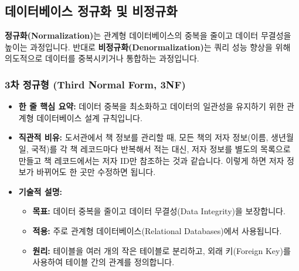 \documentclass[11pt,a4paper]{article}
\theoremstyle{definition}
\begin{document}
\subsection{데이터베이스 정규화 및 비정규화}

\begin{conceptbox}
\textbf{정규화(Normalization)}는 관계형 데이터베이스의 중복을 줄이고 데이터 무결성을 높이는 과정입니다.
반대로 \textbf{비정규화(Denormalization)}는 쿼리 성능 향상을 위해 의도적으로 데이터를 중복시키거나 통합하는 과정입니다.
\end{conceptbox}

\subsubsection{3차 정규형 (Third Normal Form, 3NF)}
\begin{itemize}
    \item \textbf{한 줄 핵심 요약:} 데이터 중복을 최소화하고 데이터의 일관성을 유지하기 위한 관계형 데이터베이스 설계 규칙입니다.
    \item \textbf{직관적 비유:} 도서관에서 책 정보를 관리할 때, 모든 책의 저자 정보(이름, 생년월일, 국적)를 각 책 레코드마다 반복해서 적는 대신, 저자 정보를 별도의 목록으로 만들고 책 레코드에서는 저자 ID만 참조하는 것과 같습니다. 이렇게 하면 저자 정보가 바뀌어도 한 곳만 수정하면 됩니다.
    \item \textbf{기술적 설명:}
    \begin{itemize}
        \item \textbf{목표:} 데이터 중복을 줄이고 데이터 무결성(Data Integrity)을 보장합니다.
        \item \textbf{적용:} 주로 관계형 데이터베이스(Relational Databases)에서 사용됩니다.
        \item \textbf{원리:} 테이블을 여러 개의 작은 테이블로 분리하고, 외래 키(Foreign Key)를 사용하여 테이블 간의 관계를 정의합니다.
    \end{itemize}
\end{itemize}
\end{document}
